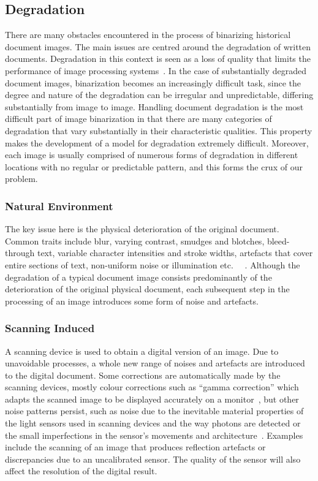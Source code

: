 \documentclass[a4paper, 12pt]{report}
\begin{document}
\subsection{Degradation}
There are many obstacles encountered in the process of binarizing historical
document images. The main issues are centred around the degradation of written
documents. Degradation in this context is seen as a loss of quality that limits
the performance of image processing systems~\cite{Baird2007}. In the case of
substantially degraded document images, binarization becomes an increasingly
difficult task, since the degree and nature of the degradation can be irregular
and unpredictable, differing substantially from image to image. Handling
document degradation is the most difficult part of image binarization in that
there are many categories of degradation that vary substantially in their
characteristic qualities. This property makes the development of a model for
degradation extremely difficult. Moreover, each image is usually comprised of
numerous forms of degradation in different locations with no regular or
predictable pattern, and this forms the crux of our problem.

\subsubsection{Natural Environment}
The key issue here is the physical deterioration of the original document.
Common traits include blur, varying contrast, smudges and blotches,
bleed-through text, variable character intensities and stroke widths, artefacts
that cover entire sections of text, non-uniform noise or illumination
etc.~\cite{gatos2006adaptive} ~\cite{ait2022innovative}. Although the
degradation of a typical document image consists predominantly of the
deterioration of the original physical document, each subsequent step in the
processing of an image introduces some form of noise and artefacts.

\subsubsection{Scanning Induced}
A scanning device is used to obtain a digital version of an image. Due to
unavoidable processes, a whole new range of noises and artefacts are introduced
to the digital document. Some corrections are automatically made by the
scanning devices, mostly colour corrections such as “gamma correction” which
adapts the scanned image to be displayed accurately on a
monitor~\cite{smoaca2011id}, but other noise patterns persist, such as noise
due to the inevitable material properties of the light sensors used in scanning
devices and the way photons are detected or the small imperfections in the
sensor’s movements and architecture~\cite{smoaca2011id}. Examples include the
scanning of an image that produces reflection artefacts or discrepancies due to
an uncalibrated sensor. The quality of the sensor will also affect the
resolution of the digital result.\par
\end{document}
